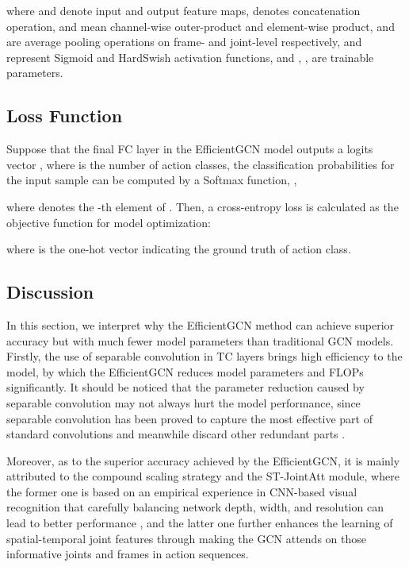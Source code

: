 \documentclass[10pt,journal,compsoc]{IEEEtran}
\begin{document}
where  and  denote input and output feature maps,  denotes concatenation operation,  and  mean channel-wise outer-product and element-wise product,  and  are average pooling operations on frame- and joint-level respectively,  and  represent Sigmoid and HardSwish  \cite{howard2019searching} activation functions, and , ,  are trainable parameters.

\subsection{Loss Function}
\label{ssec:loss}

Suppose that the final FC layer in the EfficientGCN model outputs a logits vector , where  is the number of action classes, the classification probabilities for the input sample can be computed by a Softmax function, \ie,

where  denotes the -th element of . Then, a cross-entropy loss is calculated as the objective function for model optimization:

where  is the one-hot vector indicating the ground truth of action class.

\subsection{Discussion}
\label{ssec:discussion}

In this section, we interpret why the EfficientGCN method can achieve superior accuracy but with much fewer model parameters than traditional GCN models. Firstly, the use of separable convolution in TC layers brings high efficiency to the model, by which the EfficientGCN reduces model parameters and FLOPs significantly. It should be noticed that the parameter reduction caused by separable convolution may not always hurt the model performance, since separable convolution has been proved to capture the most effective part of standard convolutions and meanwhile discard other redundant parts \cite{guo2018network}.

Moreover, as to the superior accuracy achieved by the EfficientGCN, it is mainly attributed to the compound scaling strategy and the ST-JointAtt module, where the former one is based on an empirical experience in CNN-based visual recognition that carefully balancing network depth, width, and resolution can lead to better performance \cite{tan2019efficientnet}, and the latter one further enhances the learning of spatial-temporal joint features through making the GCN attends on those informative joints and frames in action sequences.
\end{document}
